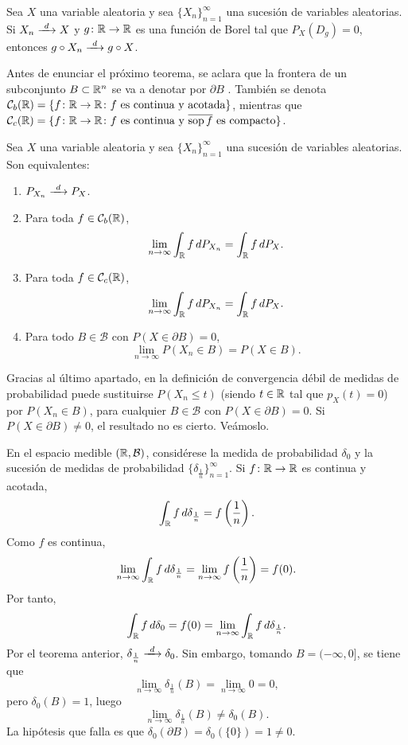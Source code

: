 \documentclass[a4paper, 11pt, extrafontsizes]{memoir}
\begin{document}
\begin{corollary}
    Sea $X$ una variable aleatoria y sea $\{X_n\}_{n=1}^\infty$ una sucesión de variables aleatorias. Si $X_n \dconv X$ y $g \colon \mathbb R \to \mathbb R$ es una función de Borel tal que $P_X(D_g) = 0$, entonces $g \circ X_n \dconv g \circ X$.
\end{corollary}

Antes de enunciar el próximo teorema, se aclara que la frontera de un subconjunto $B \subset \mathbb R^n$ se va a denotar por $\partial B$ . También se denota $\mathcal{C}_b(\mathbb R) = \{f \colon \mathbb R \to \mathbb R \colon f \textup{ es continua y acotada}\}$,
mientras que $\mathcal{C}_c(\mathbb R) = \{f \colon \mathbb R \to \mathbb R \colon f \textup{ es continua y } \overline{\textup{sop}\, f} \textup{ es compacto}\}$.


\begin{theorem}\label{teo:4.1.6}
    Sea $X$ una variable aleatoria y sea $\{X_n\}_{n=1}^\infty$ una sucesión de variables aleatorias. Son equivalentes:
    \begin{enumerate}
        \item $P_{X_n} \dconv P_X$.
        \item Para toda $f \in \mathcal{C}_b(\mathbb R)$,
        \[\lim_{n \to \infty} \int_\mathbb R f \, dP_{X_n} = \int_\mathbb R f \, dP_X.\]
        \item Para toda $f \in \mathcal{C}_c(\mathbb R)$,
        \[\lim_{n \to \infty} \int_\mathbb R f \, dP_{X_n} = \int_\mathbb R f \, dP_X.\]
        \item Para todo $B \in \mathcal{B}$ con $P(X \in \partial B) = 0$,
        \[\lim_{n \to \infty} P(X_n \in B) = P(X \in B).\]
    \end{enumerate}
\end{theorem}

Gracias al último apartado, en la definición de convergencia débil de medidas de probabilidad puede sustituirse $P(X_n \leq t)$ (siendo $t \in \mathbb R$ tal que $p_X(t)=0$) por $P(X_n \in B)$, para cualquier $B \in \mathcal{B}$ con $P(X \in \partial B) = 0$. Si $P(X \in \partial B) \neq 0$, el resultado no es cierto. Veámoslo.

\begin{example}
    En el espacio medible $(\mathbb R,\mathcal{B})$, considérese la medida de probabilidad $\delta_0$ y la sucesión de medidas de probabilidad $\{\delta_{\frac{1}{n}}\}_{n=1}^\infty$. Si $f \colon \mathbb R \to \mathbb R$ es continua y acotada,
    \[\int_\mathbb R f \, d\delta_{\frac{1}{n}} = f\left(\frac{1}{n}\right).\]
    Como $f$ es continua, 
    \[\lim_{n \to \infty}\int_\mathbb R f \, d\delta_{\frac{1}{n}} = \lim_{n\to\infty}f\left(\frac{1}{n}\right) = f(0).\]
    Por tanto,
    \[\int_\mathbb R f \, d\delta_0 = f(0) =\lim_{n \to \infty}\int_\mathbb R f \, d\delta_{\frac{1}{n}}.\]
    Por el teorema anterior, $\delta_{\frac{1}{n}} \dconv \delta_0$. Sin embargo, tomando $B = (-\infty,0]$, se tiene que
    \[\lim_{n \to \infty} \delta_{\frac{1}{n}}(B) = \lim_{n \to \infty} 0 = 0,\]
    pero $\delta_0(B) = 1$, luego
    \[\lim_{n \to \infty} \delta_{\frac{1}{n}}(B) \neq \delta_0(B).\] 
    La hipótesis que falla es que $\delta_0(\partial B) = \delta_0(\{0\}) = 1 \neq 0$.
\end{example}
\end{document}
